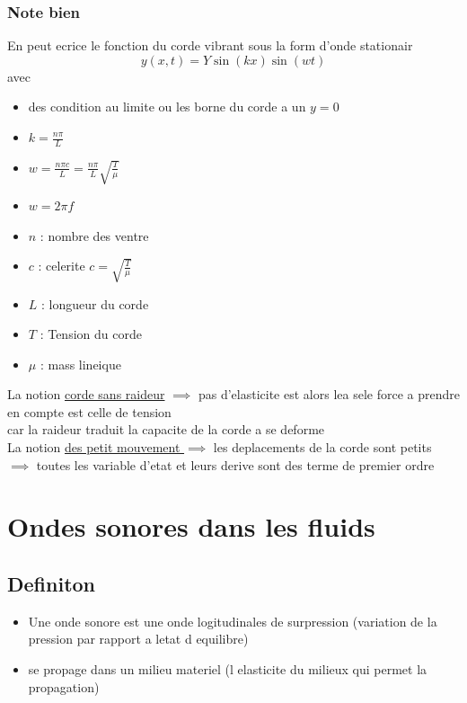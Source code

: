 \documentclass[12pt]{book}
\begin{document}
            \subsection*{Note bien}
                En peut ecrice le fonction du corde vibrant sous la form d'onde stationair 
                \[ y(x,t) = Y \sin(kx)\sin(wt) \]
                avec \begin{itemize}
                    \item des condition au limite ou les borne du corde a un $ y=0 $
                    \item $k = \frac{n\pi}{L}$
                    \item $ w = \frac{n\pi c }{L} = \frac{n\pi }{L}\sqrt{\frac{T}{\mu}} $ 
                    \item $ w = 2\pi f $
                    \item $ n $ : nombre des ventre 
                    \item  $ c $ : celerite $ c=\sqrt{\frac{T}{\mu}} $
                    \item $ L $ : longueur du corde
                    \item $ T  $ : Tension du corde 
                    \item $ \mu $ : mass lineique
                \end{itemize}
                La notion \underline{corde sans raideur} $ \implies $ pas d'elasticite est alors lea sele force a prendre en compte est celle de tension \\
                car la raideur traduit la capacite de la corde a se deforme \\ 
                La notion \underline{des petit mouvement } $ \implies $ les deplacements de la corde sont petits $ \implies $ toutes les variable d'etat et leurs derive sont des terme de premier ordre \\ 

                    
    \chapter{Ondes sonores dans les fluids}
        \section{Definiton}
            \begin{itemize}
                \item Une onde sonore est une onde logitudinales de surpression (variation de la pression par rapport a letat d equilibre)
                \item se propage dans un milieu materiel (l elasticite du milieux qui permet la propagation)
            \end{itemize}
\end{document}
